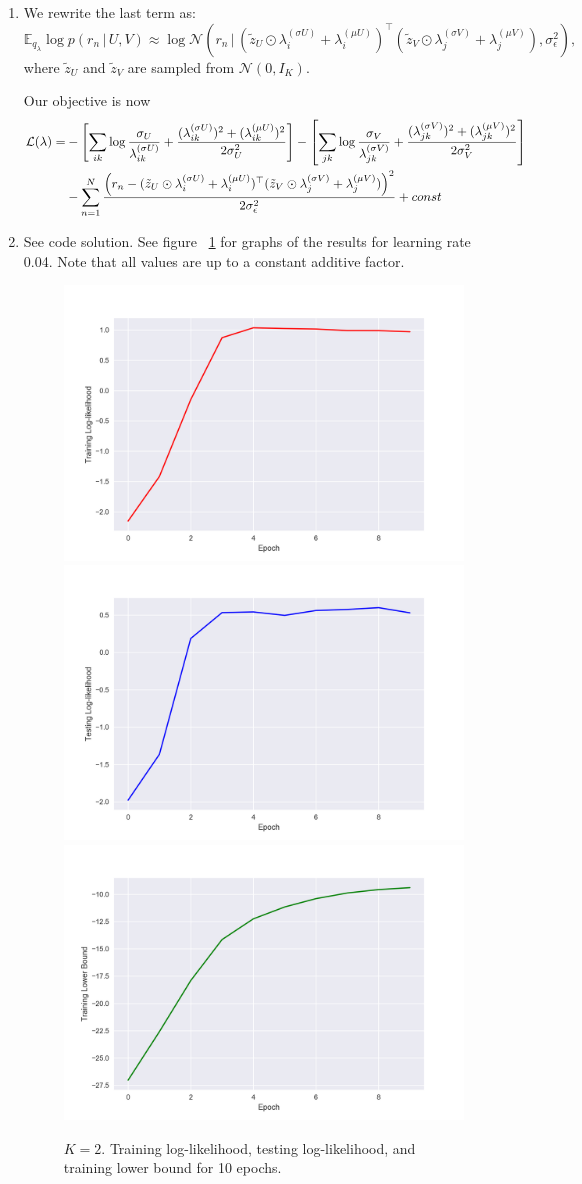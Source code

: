\documentclass[submit]{harvardml}
\newcommand{\given}{\,|\,}
\newcommand{\N}{\mathcal{N}}
\theoremstyle{plain}
\begin{document}
\begin{enumerate}
	\item We rewrite the last term as:
	\[
	\mathbb{E}_{q_\lambda} \log p(r_n\given U, V) 
	\approx 
	\log \N(r_n\given (\tilde{z}_U \odot\lambda^{(\sigma U)}_i + \lambda^{(\mu U)}_i)^\top (\tilde{z}_V \odot\lambda^{(\sigma V)}_j + \lambda^{(\mu V)}_j), \sigma_\epsilon^2),
	\]
	where $\tilde{z}_U$ and $\tilde{z}_V$ are sampled from $\N(0, I_K)$. 
	
	Our objective is now
	\begin{align*}
	{\cal L}(\lambda) =&
	-\left[\sum_{ik} \log \frac{\sigma_{U}}{\lambda^{(\sigma U)}_{ik}} + \frac{(\lambda^{(\sigma U)}_{ik})^2 + (\lambda^{(\mu U)}_{ik})^2}{2 \sigma_{U}^2}\right]
	- \left[\sum_{jk} \log \frac{\sigma_{V}}{\lambda^{(\sigma V)}_{jk}} + \frac{(\lambda^{(\sigma V)}_{jk})^2 + (\lambda^{(\mu V)}_{jk})^2}{2 \sigma_{V}^2}\right] \\
	&- \sum_{n=1}^N \frac{\left(r_n - (\tilde{z}_U \odot\lambda^{(\sigma U)}_i + \lambda^{(\mu U)}_i)^\top (\tilde{z}_V \odot\lambda^{(\sigma V)}_j + \lambda^{(\mu V)}_j)\right)^2}{2\sigma_\epsilon^2}
	+ const
	\end{align*}
	
	\item See code solution. See figure ~\ref{k2} for graphs of the results for learning rate 0.04. Note that all values are up to a constant additive factor.
	\begin{figure}
		\centering
		\includegraphics[width=.3\textwidth]{2-1}
		\includegraphics[width=.3\textwidth]{2-2}
		\includegraphics[width=.3\textwidth]{2-3}
		\caption{$K = 2$. Training log-likelihood, testing log-likelihood, and training lower bound for 10 epochs.}
		\label{k2}
	\end{figure}


\end{enumerate}
\end{document}
